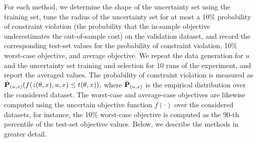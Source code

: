 \documentclass[11pt]{article}
\newcommand{\bsnote}[1]{\noindent\textcolor{red}{\texttt{Bartolomeo: #1}}}
\begin{document}
For each method, we determine the shape of the uncertainty set using the training set, tune the radius of the uncertainty set for at most a 10\% probability of constraint violation (the probability that the in-sample objective underestimates the out-of-sample cost) on the validation dataset, and record the corresponding test-set values for the probability of constraint violation, 10\% worst-case objective, and average objective. 
We repeat the data generation for $u$ and the uncertainty set training and selection for 10 runs of the experiment, and report the averaged values.
The probability of constraint violation is measured as 
$\hat{{\mathbf P}}_{(u,x)}(f(z(\theta,x),u,x) \leq t(\theta,x)),$
where $\hat{{\mathbf P}}_{(u,x)}$ is the empirical distribution over the considered dataset. 
The worst-case and average-case objectives are likewise computed using the uncertain objective function $f(\cdot)$ over the considered datasets, for instance, the 10\% worst-case objective is computed as the 90-th percentile of the test-set objective values. 
Below, we describe the methods in greater detail. 
\end{document}
